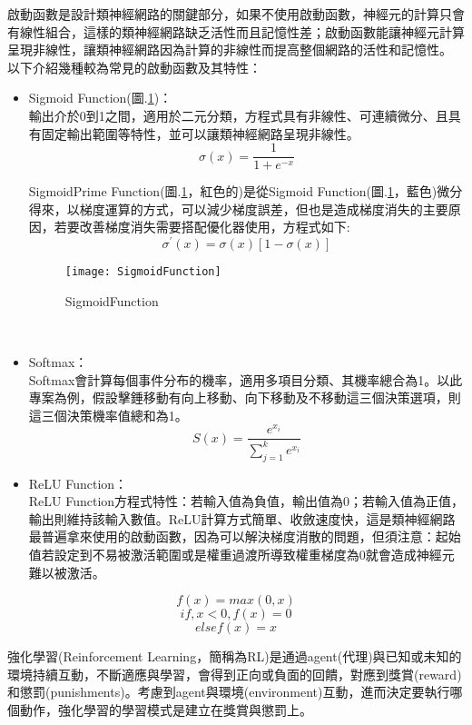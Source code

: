啟動函數是設計類神經網路的關鍵部分，如果不使用啟動函數，神經元的計算只會有線性組合，這樣的類神經網路缺乏活性而且記憶性差；啟動函數能讓神經元計算呈現非線性，讓類神經網路因為計算的非線性而提高整個網路的活性和記憶性。\\
以下介紹幾種較為常見的啟動函數及其特性：
\begin{itemize}
\item Sigmoid Function(圖.\ref{SigmoidFunction})：\\
輸出介於0到1之間，適用於二元分類，方程式具有非線性、可連續微分、且具有固定輸出範圍等特性，並可以讓類神經網路呈現非線性。
$$\sigma(x)=\frac{1}{1+e^{-x}}$$

SigmoidPrime Function(圖.\ref{SigmoidFunction}，紅色的)是從Sigmoid Function(圖.\ref{SigmoidFunction}，藍色)微分得來，以梯度運算的方式，可以減少梯度誤差，但也是造成梯度消失的主要原因，若要改善梯度消失需要搭配優化器使用，方程式如下:\\
$$\sigma^{'}(x)=\sigma(x)[1-\sigma(x)]$$
\begin{figure}[hbt!]
\begin{center}
\texttt{[image: SigmoidFunction]}
\caption{\Large SigmoidFunction}\label{SigmoidFunction}
\end{center}
\end{figure}
\\
\item Softmax：\\
Softmax會計算每個事件分布的機率，適用多項目分類、其機率總合為1。以此專案為例，假設擊錘移動有向上移動、向下移動及不移動這三個決策選項，則這三個決策機率值總和為1。\\
$$S(x)=\frac{e^{x_i}}{\sum^k_{j=1}e^{x_i}}$$
\item ReLU Function：\\
ReLU Function方程式特性：若輸入值為負值，輸出值為0；若輸入值為正值，輸出則維持該輸入數值。ReLU計算方式簡單、收斂速度快，這是類神經網路最普遍拿來使用的啟動函數，因為可以解決梯度消散的問題，但須注意：起始值若設定到不易被激活範圍或是權重過渡所導致權重梯度為0就會造成神經元難以被激活。\\
\end{itemize}
$$f(x)=max(0,x)$$
$$if , x<0 , f(x)=0$$
$$else f(x)=x$$

強化學習(Reinforcement Learning，簡稱為RL)是通過agent(代理)與已知或未知的環境持續互動，不斷適應與學習，會得到正向或負面的回饋，對應到獎賞(reward)和懲罰(punishments)。考慮到agent與環境(environment)互動，進而決定要執行哪個動作，強化學習的學習模式是建立在獎賞與懲罰上。\\


